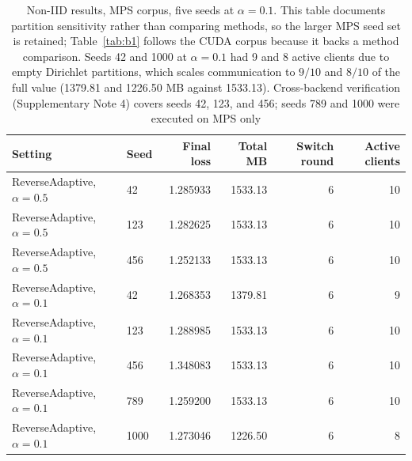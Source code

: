 \documentclass[pdflatex,sn-nature]{sn-jnl}
\begin{document}
\begin{table}[tbp]
\centering
\footnotesize
\setlength{\tabcolsep}{6pt}
\caption{Non-IID results, MPS corpus, five seeds at $\alpha{=}0.1$. This table documents partition sensitivity rather than comparing methods, so the larger MPS seed set is retained; Table~\ref{tab:b1} follows the CUDA corpus because it backs a method comparison. Seeds 42 and 1000 at $\alpha{=}0.1$ had 9 and 8 active clients due to empty Dirichlet partitions, which scales communication to $9/10$ and $8/10$ of the full value (1379.81 and 1226.50 MB against 1533.13). Cross-backend verification (Supplementary Note 4) covers seeds 42, 123, and 456; seeds 789 and 1000 were executed on MPS only}
\label{tab:b2}
\begin{tabular}{@{}llrrrr@{}}
\toprule
Setting & Seed & Final loss & Total MB & Switch round & Active clients \\
\midrule
ReverseAdaptive, $\alpha{=}0.5$ & 42 & 1.285933 & 1533.13 & 6 & 10 \\
ReverseAdaptive, $\alpha{=}0.5$ & 123 & 1.282625 & 1533.13 & 6 & 10 \\
ReverseAdaptive, $\alpha{=}0.5$ & 456 & 1.252133 & 1533.13 & 6 & 10 \\
ReverseAdaptive, $\alpha{=}0.1$ & 42 & 1.268353 & 1379.81 & 6 & 9 \\
ReverseAdaptive, $\alpha{=}0.1$ & 123 & 1.288985 & 1533.13 & 6 & 10 \\
ReverseAdaptive, $\alpha{=}0.1$ & 456 & 1.348083 & 1533.13 & 6 & 10 \\
ReverseAdaptive, $\alpha{=}0.1$ & 789 & 1.259200 & 1533.13 & 6 & 10 \\
ReverseAdaptive, $\alpha{=}0.1$ & 1000 & 1.273046 & 1226.50 & 6 & 8 \\
\bottomrule
\end{tabular}
\end{table}
\end{document}
